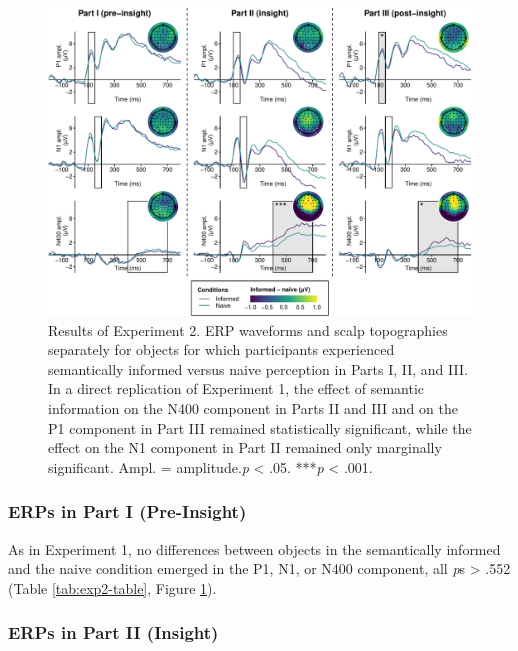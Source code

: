 \documentclass[
  english,
  man,11pt,floatsintext]{apa7}
\begin{document}
\begin{figure}

{\centering \includegraphics{manuscript_files/figure-latex/exp2-plot-1} 

}

\caption{Results of Experiment 2. ERP waveforms and scalp topographies separately for objects for which participants experienced semantically informed versus naive perception in Parts I, II, and III. In a direct replication of Experiment 1, the effect of semantic information on the N400 component in Parts II and III and on the P1 component in Part III remained statistically significant, while the effect on the N1 component in Part II remained only marginally significant. Ampl. = amplitude.\newline*\emph{p} \textless{} .05. ***\emph{p} \textless{} .001.}\label{fig:exp2-plot}
\end{figure}

\hypertarget{erps-in-part-i-pre-insight-1}{%
\subsubsection{ERPs in Part I (Pre-Insight)}\label{erps-in-part-i-pre-insight-1}}

As in Experiment 1, no differences between objects in the semantically informed and the naive condition emerged in the P1, N1, or N400 component, all \emph{p}s \textgreater{} .552 (Table \ref{tab:exp2-table}, Figure \ref{fig:exp2-plot}).

\hypertarget{erps-in-part-ii-insight-1}{%
\subsubsection{ERPs in Part II (Insight)}\label{erps-in-part-ii-insight-1}}
\end{document}
